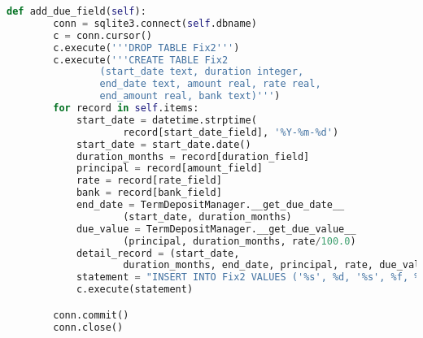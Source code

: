 \begin{lstlisting}[language=Python]
  def add_due_field(self):
        conn = sqlite3.connect(self.dbname)
        c = conn.cursor()
        c.execute('''DROP TABLE Fix2''')
        c.execute('''CREATE TABLE Fix2 
        		(start_date text, duration integer, 
        		end_date text, amount real, rate real, 
        		end_amount real, bank text)''')
        for record in self.items:
            start_date = datetime.strptime(
            		record[start_date_field], '%Y-%m-%d')
            start_date = start_date.date()
            duration_months = record[duration_field]
            principal = record[amount_field]
            rate = record[rate_field]
            bank = record[bank_field]
            end_date = TermDepositManager.__get_due_date__
            		(start_date, duration_months)
            due_value = TermDepositManager.__get_due_value__
            		(principal, duration_months, rate/100.0) 
            detail_record = (start_date, 
            		duration_months, end_date, principal, rate, due_value, bank)
            statement = "INSERT INTO Fix2 VALUES ('%s', %d, '%s', %f, %f, %.2f, '%s')" % detail_record; 
            c.execute(statement)

        conn.commit()
        conn.close()
\end{lstlisting}













